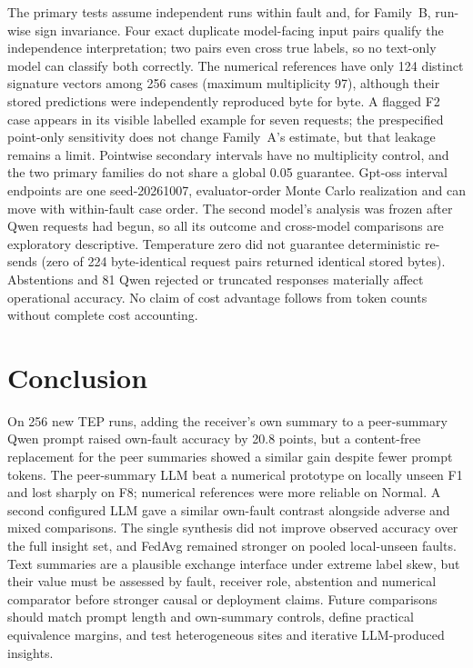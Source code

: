 \documentclass[conference]{IEEEtran}
\newcommand{\TEP}{TEP}
\begin{document}
The primary tests assume independent runs within fault and, for Family~B, run-wise sign invariance. Four exact duplicate model-facing input pairs qualify the independence interpretation; two pairs even cross true labels, so no text-only model can classify both correctly. The numerical references have only 124 distinct signature vectors among 256 cases (maximum multiplicity 97), although their stored predictions were independently reproduced byte for byte. A flagged F2 case appears in its visible labelled example for seven requests; the prespecified point-only sensitivity does not change Family~A's estimate, but that leakage remains a limit. Pointwise secondary intervals have no multiplicity control, and the two primary families do not share a global 0.05 guarantee. Gpt-oss interval endpoints are one seed-20261007, evaluator-order Monte Carlo realization and can move with within-fault case order. The second model's analysis was frozen after Qwen requests had begun, so all its outcome and cross-model comparisons are exploratory descriptive. Temperature zero did not guarantee deterministic re-sends (zero of 224 byte-identical request pairs returned identical stored bytes). Abstentions and 81 Qwen rejected or truncated responses materially affect operational accuracy. No claim of cost advantage follows from token counts without complete cost accounting.

\section{Conclusion}
\label{sec:conclusion}
On 256 new \TEP{} runs, adding the receiver's own summary to a peer-summary Qwen prompt raised own-fault accuracy by 20.8 points, but a content-free replacement for the peer summaries showed a similar gain despite fewer prompt tokens. The peer-summary LLM beat a numerical prototype on locally unseen F1 and lost sharply on F8; numerical references were more reliable on Normal. A second configured LLM gave a similar own-fault contrast alongside adverse and mixed comparisons. The single synthesis did not improve observed accuracy over the full insight set, and FedAvg remained stronger on pooled local-unseen faults. Text summaries are a plausible exchange interface under extreme label skew, but their value must be assessed by fault, receiver role, abstention and numerical comparator before stronger causal or deployment claims. Future comparisons should match prompt length and own-summary controls, define practical equivalence margins, and test heterogeneous sites and iterative LLM-produced insights.



\balance


\end{document}
